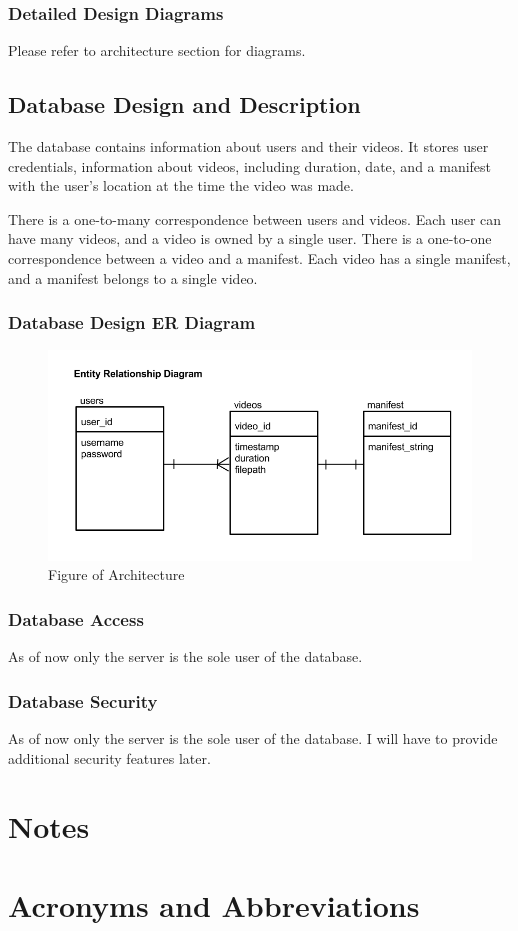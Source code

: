 \documentclass[11pt,a4paper,titlepage]{article}
\begin{document}
\subsubsection{Detailed Design Diagrams}
Please refer to architecture section for diagrams.
\subsection{Database Design and Description}
The database contains information about users and their videos. It stores user credentials, information about videos, including duration, date, and a manifest with the user's location at the time the video was made.

There is a one-to-many correspondence between users and videos. Each user can have many videos, and a video is owned by a single user. There is a one-to-one correspondence between a video and a manifest. Each video has a single manifest, and a manifest belongs to a single video.

\subsubsection{Database Design ER Diagram}
\begin{figure}[H]
  \centering
  \includegraphics[width=5in]{img/erd.png}
  \caption{Figure of Architecture}
\end{figure}
\subsubsection{Database Access}
As of now only the server is the sole user of the database. 
\subsubsection{Database Security}
As of now only the server is the sole user of the database. I will have to provide additional security features later.
\section{Notes}
\section{Acronyms and Abbreviations}
\end{document}
